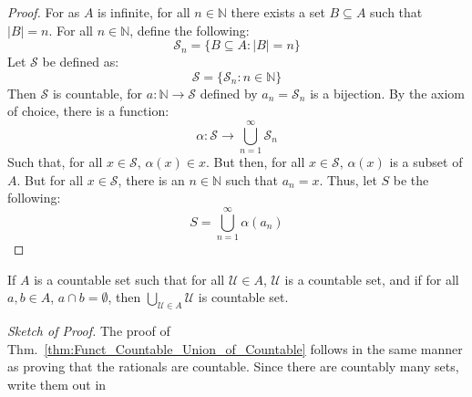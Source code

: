 \documentclass[crop=false,class=book,oneside]{standalone}
\begin{document}
            \begin{proof}
                For as $A$ is infinite, for all $n\in\mathbb{N}$
                there exists a set $B\subseteq{A}$ such that
                $|B|=n$. For all $n\in\mathbb{N}$,
                define the following:
                \begin{equation}
                    \mathcal{S}_{n}=\{B\subseteq{A}:|B|=n\}
                \end{equation}
                Let $\mathcal{S}$ be defined as:
                \begin{equation}
                    \mathcal{S}=\{\mathcal{S}_{n}:n\in\mathbb{N}\}
                \end{equation}
                Then $\mathcal{S}$ is countable, for
                $a:\mathbb{N}\rightarrow\mathcal{S}$ defined
                by $a_{n}=\mathcal{S}_{n}$ is a bijection.
                By the axiom of choice, there is a function:
                \begin{equation}
                    \alpha:\mathcal{S}\rightarrow
                    \bigcup_{n=1}^{\infty}\mathcal{S}_{n}
                \end{equation}
                Such that, for all $x\in\mathcal{S}$,
                $\alpha(x)\in{x}$. But then, for all
                $x\in\mathcal{S}$, $\alpha(x)$ is a subset
                of $A$. But for all $x\in\mathcal{S}$, there
                is an $n\in\mathbb{N}$ such that
                $a_{n}=x$. Thus, let $S$ be the following:
                \begin{equation}
                    S=\bigcup_{n=1}^{\infty}\alpha(a_{n})
                \end{equation}
            \end{proof}
            \begin{theorem}
                \label{thm:Funct_Countable_Union_of_Countable}
                If $A$ is a countable set such that for all
                $\mathcal{U}\in{A}$, $\mathcal{U}$ is a
                countable set, and if for all $a,b\in{A}$,
                $a\cap{b}=\emptyset$, then
                $\bigcup_{\mathcal{U}\in{A}}\mathcal{U}$
                is countable set.
            \end{theorem}
            \textit{Sketch of Proof.} The proof of
            Thm.~\ref{thm:Funct_Countable_Union_of_Countable}
            follows in the same manner
            as proving that the rationals are countable. Since
            there are countably many sets, write them out in
\end{document}
